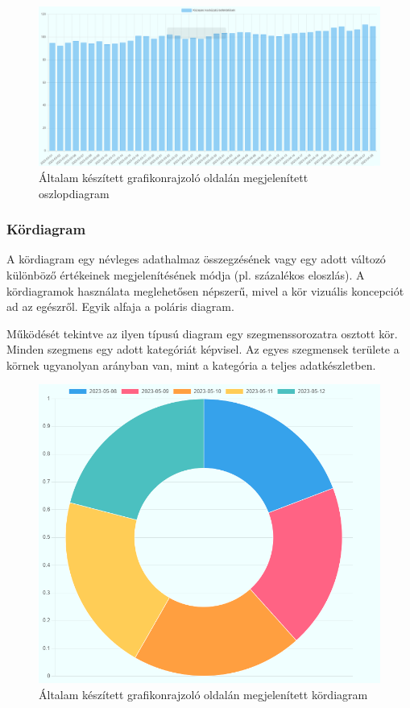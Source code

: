 \clearpage

\begin{figure}[h]
\centering
\includegraphics[scale=0.3]{images/barChartExample}
\caption{Általam készített grafikonrajzoló oldalán megjelenített oszlopdiagram}
\end{figure}

\subsubsection{Kördiagram}

A kördiagram egy névleges adathalmaz összegzésének vagy egy adott változó különböző értékeinek megjelenítésének módja (pl. százalékos eloszlás). A kördiagramok használata meglehetősen népszerű, mivel a kör vizuális koncepciót ad az egészről. Egyik alfaja a poláris diagram.

	Működését tekintve az ilyen típusú diagram egy szegmenssorozatra osztott kör. Minden szegmens egy adott kategóriát képvisel. Az egyes szegmensek területe a körnek ugyanolyan arányban van, mint a kategória a teljes adatkészletben.

\begin{figure}[h]
\centering
\includegraphics[scale=0.4]{images/pieChartExample}
\caption{Általam készített grafikonrajzoló oldalán megjelenített kördiagram}
\end{figure}

